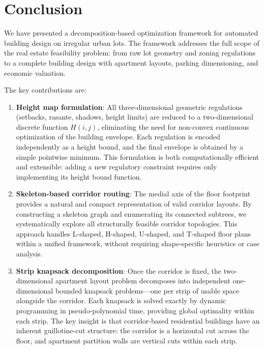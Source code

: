\documentclass[11pt,a4paper]{article}
\begin{document}
\section{Conclusion}\label{sec:conclusion}

We have presented a decomposition-based optimization framework for
automated building design on irregular urban lots. The framework addresses
the full scope of the real estate feasibility problem: from raw lot
geometry and zoning regulations to a complete building design with
apartment layouts, parking dimensioning, and economic valuation.

The key contributions are:

\begin{enumerate}
    \item \textbf{Height map formulation}: All three-dimensional geometric
    regulations (setbacks, rasante, shadows, height limits) are reduced
    to a two-dimensional discrete function $H(i,j)$, eliminating the
    need for non-convex continuous optimization of the building envelope.
    Each regulation is encoded independently as a height bound, and the
    final envelope is obtained by a simple pointwise minimum. This
    formulation is both computationally efficient and extensible: adding
    a new regulatory constraint requires only implementing its height
    bound function.

    \item \textbf{Skeleton-based corridor routing}: The medial axis of
    the floor footprint provides a natural and compact representation
    of valid corridor layouts. By constructing a skeleton graph and
    enumerating its connected subtrees, we systematically explore all
    structurally feasible corridor topologies. This approach handles
    L-shaped, H-shaped, U-shaped, and T-shaped floor plans within a
    unified framework, without requiring shape-specific heuristics or
    case analysis.

    \item \textbf{Strip knapsack decomposition}: Once the corridor is
    fixed, the two-dimensional apartment layout problem decomposes into
    independent one-dimensional bounded knapsack problems---one per
    strip of usable space alongside the corridor. Each knapsack is
    solved exactly by dynamic programming in pseudo-polynomial time,
    providing global optimality within each strip. The key insight is
    that corridor-based residential buildings have an inherent
    guillotine-cut structure: the corridor is a horizontal cut across
    the floor, and apartment partition walls are vertical cuts within
    each strip.


\end{enumerate}
\end{document}
